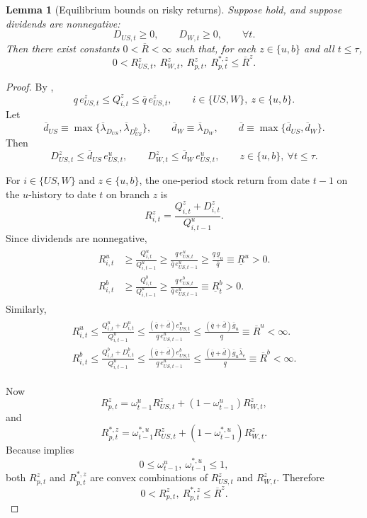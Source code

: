 \documentclass[12pt]{article}
\theoremstyle{plain}
\newtheorem{lem}{Lemma}
\begin{document}
\begin{lem}[Equilibrium bounds on risky returns]\label{lem_risky_return_bounds}
Suppose
hold, and suppose dividends are nonnegative:
\[
D_{US,t}\ge 0,
\qquad
D_{W,t}\ge 0,
\qquad \forall t.
\]
Then there exist constants $0< \overline R<\infty$ such that, for each
$z\in\{u,b\}$ and all $t\le\tau$,
\[
0
<
R_{US,t}^z,\ R_{W,t}^z,\ R_{p,t}^z,\ R_{p,t}^{*,z}
\le
\overline R^z.
\]
\end{lem}

\begin{proof}
By ,
\[
\underline q\,e_{US,t}^z
\le
Q_{i,t}^z
\le
\overline q\,e_{US,t}^z,
\qquad
i\in\{US,W\},\ z\in\{u,b\}.
\]
Let
\[
\overline d_{US}\equiv \max\{\overline\lambda_{D_{US}},\overline\lambda_{D^b_{US}}\},
\qquad
\overline d_W\equiv \overline\lambda_{D_W},
\qquad
\overline d\equiv \max\{\overline d_{US},\overline d_W\}.
\]
Then
\[
D_{US,t}^z\le \overline d_{US}\,e_{US,t}^u,
\qquad
D_{W,t}^z\le \overline d_W\,e_{US,t}^u,
\qquad
z\in\{u,b\},\ \forall t\le\tau.
\]

For $i\in\{US,W\}$ and $z\in\{u,b\}$, the one-period stock return from date $t-1$ on the $u$-history to
date $t$ on branch $z$ is
\[
R_{i,t}^z=\frac{Q_{i,t}^z+D_{i,t}^z}{Q_{i,t-1}^u}.
\]
Since dividends are nonnegative,
\begin{align*}
\begin{split}
R_{i,t}^u
& \ge
\frac{Q_{i,t}^u}{Q_{i,t-1}^u}
\ge
\frac{\underline q\,e_{US,t}^u}{\overline q\,e_{US,t-1}^u}
\ge
\frac{\underline q\,\underline g_u}{\overline q}
\equiv
\underline R^u
>0.
\\
R_{i,t}^b
& \ge
\frac{Q_{i,t}^b}{Q_{i,t-1}^u}
\ge
\frac{\underline q\,e_{US,t}^b}{\overline q\,e_{US,t-1}^u}
\equiv
\underline R^b_t
>0.
\end{split}
\end{align*}
Similarly,
\begin{align*}
\begin{split}
R_{i,t}^u
\le
\frac{Q_{i,t}^u+D_{i,t}^u}{Q_{i,t-1}^u}
\le
\frac{(\overline q+\overline d)e_{US,t}^u}{\underline q\,e_{US,t-1}^u}
\le
\frac{(\overline q+\overline d)\overline g_u }{\underline q}
\equiv
\overline R^u
<\infty.
\\
R_{i,t}^b
\le
\frac{Q_{i,t}^b+D_{i,t}^b}{Q_{i,t-1}^u}
\le
\frac{(\overline q+\overline d)e_{US,t}^b}{\underline q\,e_{US,t-1}^u}
\le
\frac{(\overline q+\overline d)\overline g_u \overline \lambda_e}{\underline q}
\equiv
\overline R^b
<\infty.
\end{split}
\end{align*}

Now
\[
R_{p,t}^z
=
\omega_{t-1}^u R_{US,t}^z+(1-\omega_{t-1}^u)R_{W,t}^z,
\]
and
\[
R_{p,t}^{*,z}
=
\omega_{t-1}^{*,u} R_{US,t}^z+(1-\omega_{t-1}^{*,u})R_{W,t}^z.
\]
Because  implies
\[
0\le \omega_{t-1}^u,\ \omega_{t-1}^{*,u}\le 1,
\]
both $R_{p,t}^z$ and $R_{p,t}^{*,z}$ are convex combinations of
$R_{US,t}^z$ and $R_{W,t}^z$. Therefore
\[
0
<
R_{p,t}^z,\ R_{p,t}^{*,z}
\le
\overline R^z.
\]
\end{proof}
\end{document}
